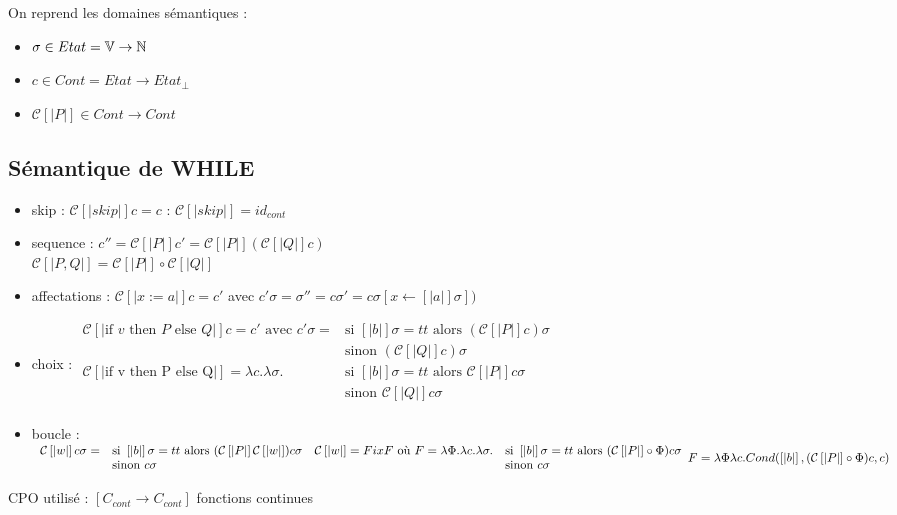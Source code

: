 \documentclass[10pt,a4paper]{article}
\newcommand{\semm}[1]{\left[| #1 | \right]}
\newcommand{\Vs}{\mathbb{V}}
\begin{document}
On reprend les domaines sémantiques : 
\begin{itemize}
 \item $\sigma \in Etat = \Vs \to \Ns$
 \item $c \in Cont = Etat \to Etat_{\perp}$
 \item $\mathcal{C} \semm{P} \in Cont \to Cont$
\end{itemize}

\subsection{Sémantique de WHILE}

\begin{itemize}
 \item skip : $\mathcal{C}\semm{skip} c = c$ : $\mathcal{C}\semm{skip} = id_{cont}$\\
 \item sequence : $c'' = \mathcal{C}\semm{P} c' = \mathcal{C}\semm{P}(\mathcal{C}\semm{Q} c)$\\
		  $\mathcal{C}\semm{P, Q} = \mathcal{C}\semm{P} \circ \mathcal{C}\semm{Q}$\\
 \item affectations :  $\mathcal{C}\semm{x:=a} c = c'$ avec $c' \sigma = \sigma'' = c \sigma' = c \sigma[x \leftarrow \semm{a} \sigma])$\\
 \item choix : 
$\begin{array}{ll}
\mathcal{C}\semm{\text{if $v$ then $P$ else $Q$}} c = c'\text{ avec }c' \sigma =&\text{si }\semm{b} \sigma = tt \text{ alors } (\mathcal{C}\semm{P} c) \sigma \\
 &\text{sinon } (\mathcal{C}\semm{Q} c) \sigma\\
   \mathcal{C}\semm{\text{if v then P else Q}} = \lambda c. \lambda \sigma. &\text{si } \semm{b} \sigma = tt\text{ alors } \mathcal{C}\semm{P} c \sigma  \\
 &\text{sinon } \mathcal{C}\semm{Q} c \sigma\\
\end{array}$
 \item boucle : \\$
\begin{array}{ll}
 \mathcal{C}\semm{w} c \sigma = &\text{si } \semm{b} \sigma = tt \text{ alors } (\mathcal{C}\semm{P} \mathcal{C}\semm{w}) c \sigma \\
  &\text{sinon } c \sigma\\
\end{array}\\
\begin{array}{ll}
 \mathcal{C}\semm{w} = Fix F \text{ où } F = \lambda \Phi .  \lambda c. \lambda \sigma. &\text{si } \semm{b} \sigma = tt \text{ alors } (\mathcal{C}\semm{P} \circ \Phi) c \sigma \\
&\text{sinon } c \sigma\\ 
\end{array}\\
F = \lambda \Phi \lambda c . Cond ( \semm{b},  (\mathcal{C}\semm{P} \circ \Phi) c, c)\\
$
\end{itemize}
CPO utilisé : $[C_{cont} \to C_{cont}]$ fonctions continues
\end{document}

